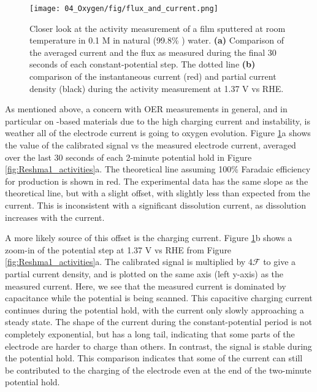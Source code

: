 \begin{figure}[h!]
	\texttt{[image: 04\_Oxygen/fig/flux\_and\_current.png]}
	\caption{Closer look at the activity measurement of a  film sputtered at room temperature in 0.1 M  in  natural (99.8\% ) water. \textbf{(a)} Comparison of the averaged current and the  flux as measured during the final 30 seconds of each constant-potential step. The dotted line  \textbf{(b)} comparison of the instantaneous current (red) and  partial current density (black) during the activity measurement at 1.37 V vs RHE.}
	\label{fig:flux_and_current}
\end{figure}

As mentioned above, a concern with OER measurements in general, and in particular on -based materials due to the high charging current and instability, is weather all of the electrode current is going to oxygen evolution. Figure \ref{fig:flux_and_current}a shows the value of the calibrated  signal vs the measured electrode current, averaged over the last 30 seconds of each 2-minute potential hold in Figure \ref{fig:Reshma1_activities}a. The theoretical line assuming 100\% Faradaic efficiency for  production is shown in red. The experimental data has the same slope as the theoretical line, but with a slight offset, with slightly less  than expected from the current. This is inconsistent with a significant dissolution current, as  dissolution increases with the current\cite{Cherevko2016}.

A more likely source of this offset is the charging current. Figure \ref{fig:flux_and_current}b shows a zoom-in of the potential step at 1.37 V vs RHE from Figure \ref{fig:Reshma1_activities}a. The calibrated  signal is multiplied by 4$\mathcal{F}$ to give a partial current density, and is plotted on the same axis (left y-axis) as the measured current. Here, we see that the measured current is dominated by capacitance while the potential is being scanned. This capacitive charging current continues during the potential hold, with the current only slowly approaching a steady state. The shape of the current during the constant-potential period is not completely exponential, but has a long tail, indicating that some parts of the electrode are harder to charge than others. In contrast, the  signal is stable during the potential hold. This comparison indicates that some of the current can still be contributed to the charging of the electrode even at the end of the two-minute potential hold.

